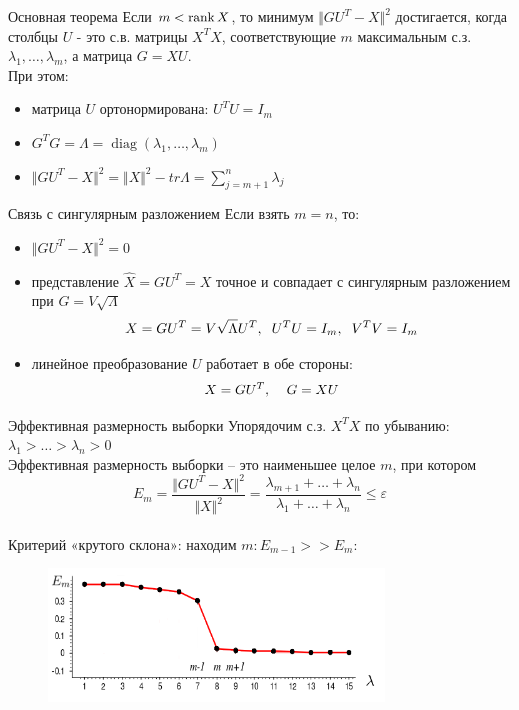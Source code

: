 \documentclass[10pt]{beamer}
\begin{document}
\begin{frame}{Основная теорема}
	Если $m < \operatorname{rank} X$, то минимум $\Vert GU^T - X \Vert^2$ достигается, когда столбцы $U$ - это с.в. матрицы $X^TX$, соответствующие $m$ максимальным с.з. $\lambda_1,\dots, \lambda_m$, а матрица $G = XU$.\\
	\bigbreak
	\pause
	При этом:\\
	\begin{itemize}
		\item матрица $U$ ортонормирована: $U^TU = I_m$
		\item $G^TG = \Lambda = \operatorname{diag}(\lambda_1, \dots, \lambda_m)$
		\item $\Vert GU^T - X \Vert^2 = \Vert X \Vert^2 - tr \Lambda = \sum\limits_{j=m+1}^n \lambda_j$
	\end{itemize}
\end{frame}

\begin{frame}{Связь с сингулярным разложением}
	Если взять $m = n$, то:\\
	\begin{itemize}[<+->]
	\item $\Vert GU^T - X \Vert^2 = 0$
	\item представление $\hat{X} = GU^T = X$ точное и совпадает с сингулярным разложением при $G = V \sqrt{\Lambda}$
	$$X = GU^T = V\sqrt{\Lambda}U^T, \hspace{2mm} U^TU = I_m, \hspace{2mm} V^TV = I_m$$
	\item линейное преобразование $U$ работает в обе стороны:\\
	$$X = GU^T, \hspace{4mm} G=XU$$
	\end{itemize}
\end{frame}

\begin{frame}{Эффективная размерность выборки}
	Упорядочим с.з. $X^TX$ по убыванию: $\lambda_1 > \dots > \lambda_n > 0$\\
	Эффективная размерность выборки -- это наименьшее целое $m$, при котором\\
	$$E_m = \frac{\Vert GU^T - X \Vert^2}{\Vert X \Vert^2} = \frac{\lambda_{m+1} + \dots + \lambda_{n}}{\lambda_1 + \dots + \lambda_n} \leq \varepsilon$$\\
	\pause
	Критерий «крутого склона»: находим $m: E_{m-1} >> E_m$:
	\begin{figure}[htbp]
	  \includegraphics[height=100pt, keepaspectratio = true]{images/edge}
	\end{figure}
\end{frame}
\end{document}
